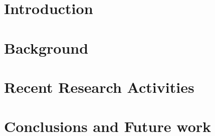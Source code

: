 \documentclass{report}
\begin{document}
    \chapter{Introduction}
    \chapter{Background}
    \chapter{Recent Research Activities}
    \chapter{Conclusions and Future work}
\end{document}
